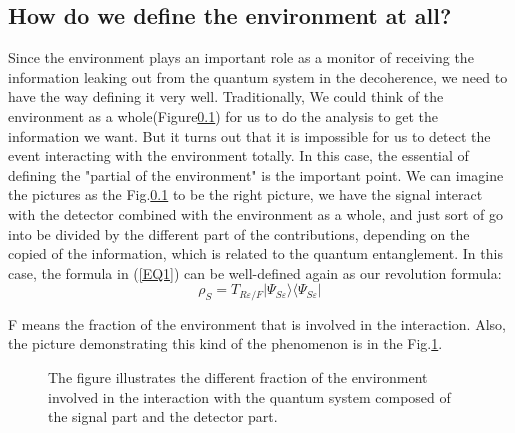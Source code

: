\documentclass[final,1p,12pt]{elsarticle}
\begin{document}
\subsection{How do we define the environment at all?}
Since the environment plays an important role as a monitor of receiving the information leaking out from the quantum system in the decoherence, we need to have the way defining it very well. Traditionally, We could think of the environment as a whole(Figure\ref{}) for us to do the analysis to get the information we want. But it turns out that it is impossible for us to detect the event interacting with the environment totally. In this case, the essential of defining the "partial of the environment" is the important point. We can imagine the pictures as the Fig.\ref{} to be the right picture, we have the signal interact with the detector combined with the environment as a whole, and just sort of go into be divided by the different part of the contributions, depending on the copied of the information, which is related to the quantum entanglement. In this case, the formula in (\ref{EQ1}) can be well-defined again as our revolution formula: \\ 
\begin{equation}
\rho_{S} = T_{R\varepsilon/F} | \Psi_{S\varepsilon} \rangle  \langle \Psi_{S\varepsilon} | 
\end{equation}

F means the fraction of the environment that is involved in the interaction. Also, the picture demonstrating this kind of the phenomenon is in the Fig.\ref{111}.\\
\begin{figure}
\begin{center}
\end{center}
\caption{The figure illustrates the different fraction of the environment involved in the interaction with the quantum system composed of the signal part and the detector part.}
\label{111}
\end{figure}
\end{document}

